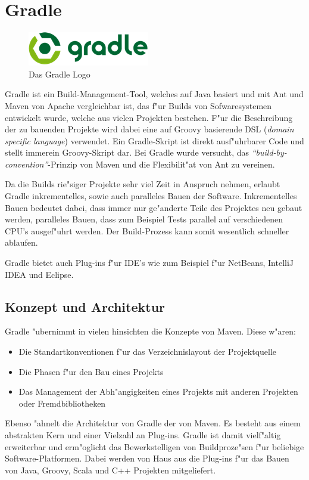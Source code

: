 \section{Gradle}
\begin{figure}[h]
	\begin{center}
		\includegraphics{./fig/gradle_logo.png}
		\caption{Das Gradle Logo}
		\label{fig:gradle_logo}
	\end{center}
\end{figure}
Gradle ist ein Build-Management-Tool, welches auf Java basiert und mit Ant und Maven von Apache vergleichbar ist, das f"ur Builds  von Sofwaresystemen entwickelt wurde, welche aus vielen Projekten bestehen.
F"ur die Beschreibung der zu bauenden Projekte wird dabei eine auf Groovy basierende DSL (\textit{domain specific language}) verwendet.
Ein Gradle-Skript ist direkt ausf"uhrbarer Code und stellt immerein Groovy-Skript dar.
Bei Gradle wurde versucht, das \textit{``build-by-convention''}-Prinzip von Maven und die Flexibilit"at von Ant zu vereinen.

Da die Builds rie"siger Projekte sehr viel Zeit in Anspruch nehmen, erlaubt Gradle inkrementelles, sowie auch paralleles Bauen der Software.
Inkrementelles Bauen bedeutet dabei, dass immer nur ge"anderte Teile des Projektes neu gebaut werden, paralleles Bauen, dass zum Beispiel Tests parallel auf verschiedenen CPU's ausgef"uhrt werden.
Der Build-Prozess kann somit wesentlich schneller ablaufen.

Gradle bietet auch Plug-ins f"ur IDE's wie zum Beispiel f"ur NetBeans, IntelliJ IDEA und Eclipse.

\subsection{Konzept und Architektur}
Gradle "ubernimmt in vielen hinsichten die Konzepte von Maven. Diese w"aren:
\begin{itemize}
	\item Die Standartkonventionen f"ur das Verzeichnislayout der Projektquelle
	\item Die Phasen f"ur den Bau eines Projekts
	\item Das Management der Abh"angigkeiten eines Projekts mit anderen Projekten oder Fremdbibliotheken
\end{itemize}
Ebenso "ahnelt die Architektur von Gradle der von Maven.
Es besteht aus einem abstrakten Kern und einer Vielzahl an Plug-ins. Gradle ist damit vielf"altig erweiterbar und erm"oglicht das Bewerkstelligen von Buildproze"sen f"ur beliebige Software-Platformen.
Dabei werden von Haus aus die Plug-ins f"ur das Bauen von Java, Groovy, Scala und C++ Projekten mitgeliefert.

